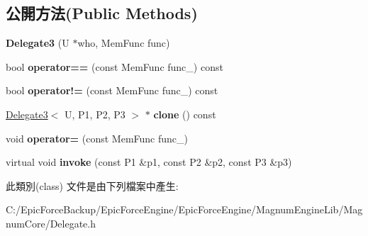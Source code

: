 \subsection*{公開方法(Public Methods)}
\begin{DoxyCompactItemize}
\item 
{\bfseries Delegate3} (U $\ast$who, Mem\+Func func)\hypertarget{class_magnum_1_1_delegate3_acb6de66bb8822bdab2850f4aac35cdff}{}\label{class_magnum_1_1_delegate3_acb6de66bb8822bdab2850f4aac35cdff}

\item 
bool {\bfseries operator==} (const Mem\+Func func\+\_\+) const \hypertarget{class_magnum_1_1_delegate3_abed8a12cecaf0e0952d08de5258df4a9}{}\label{class_magnum_1_1_delegate3_abed8a12cecaf0e0952d08de5258df4a9}

\item 
bool {\bfseries operator!=} (const Mem\+Func func\+\_\+) const \hypertarget{class_magnum_1_1_delegate3_acace522ef97296a4217a1d43895f00f7}{}\label{class_magnum_1_1_delegate3_acace522ef97296a4217a1d43895f00f7}

\item 
\hyperlink{class_magnum_1_1_delegate3}{Delegate3}$<$ U, P1, P2, P3 $>$ $\ast$ {\bfseries clone} () const \hypertarget{class_magnum_1_1_delegate3_a5c4242cb85ff9b920c07399049d88a10}{}\label{class_magnum_1_1_delegate3_a5c4242cb85ff9b920c07399049d88a10}

\item 
void {\bfseries operator=} (const Mem\+Func func\+\_\+)\hypertarget{class_magnum_1_1_delegate3_a8348a67a407aa262fb16bcac934c032f}{}\label{class_magnum_1_1_delegate3_a8348a67a407aa262fb16bcac934c032f}

\item 
virtual void {\bfseries invoke} (const P1 \&p1, const P2 \&p2, const P3 \&p3)\hypertarget{class_magnum_1_1_delegate3_a093787532e1b4e87635789776e57e735}{}\label{class_magnum_1_1_delegate3_a093787532e1b4e87635789776e57e735}

\end{DoxyCompactItemize}


此類別(class) 文件是由下列檔案中產生\+:\begin{DoxyCompactItemize}
\item 
C\+:/\+Epic\+Force\+Backup/\+Epic\+Force\+Engine/\+Epic\+Force\+Engine/\+Magnum\+Engine\+Lib/\+Magnum\+Core/Delegate.\+h\end{DoxyCompactItemize}
